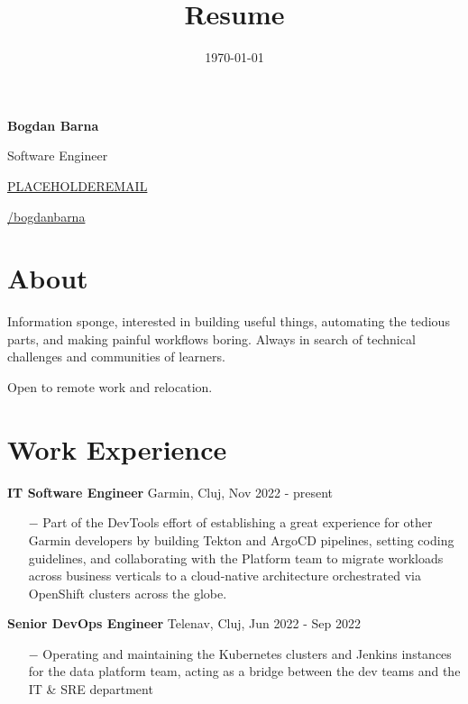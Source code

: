 \documentclass{article}
\title{Resume}
\author{\myname}
\date{\today}
\newcommand\myname{Bogdan Barna}
\newcommand\myemail{PLACEHOLDEREMAIL}
\newcommand\mygithub{bogdanbarna}
\begin{document}
\setlength{\parskip}{2pt}

\begin{center}
    \vspace*{2pt}
    \Large{
    \textbf{\myname}}
\end{center}

\setlength{\parskip}{1pt}
\noindent Software Engineer

\href{mailto:\myemail}{\hfill \myemail}

\href{https://github.com/\mygithub}{\hfill \faGithub/\mygithub}

\setlength{\parskip}{0.1em}

\section*{About}
\indent \par
Information sponge, interested in building useful things, automating the tedious parts, and
making painful workflows boring. Always in search of technical challenges and communities of learners.\par
Open to remote work and relocation.

\section*{Work Experience}
\indent

\textbf{IT Software Engineer} \hfill Garmin, Cluj, Nov 2022 - present
\begin{itemize}
    \item[$-$] Part of the DevTools effort of establishing a great experience for other Garmin developers by building Tekton and ArgoCD pipelines, setting coding guidelines, and collaborating with the Platform team to migrate workloads across business verticals to a cloud-native architecture orchestrated via OpenShift clusters across the globe.
\end{itemize}

\textbf{Senior DevOps Engineer} \hfill Telenav, Cluj, Jun 2022 - Sep 2022
\begin{itemize}
    \item[$-$] Operating and maintaining the Kubernetes clusters and Jenkins instances for the data platform team, acting as a bridge between the dev teams and the IT \& SRE department
\end{itemize}
\end{document}
